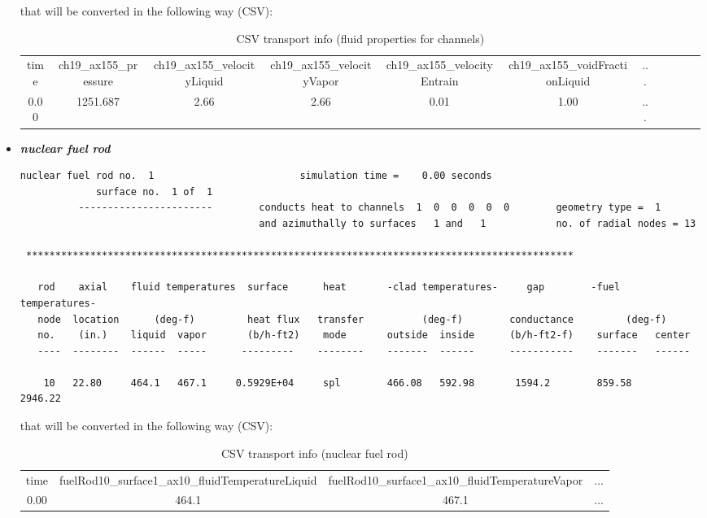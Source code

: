 \begin{itemize}
\begin{lstlisting}[basicstyle=\tiny]
  \end{lstlisting}
   that will be converted in the following way (CSV):
   \begin{table}[h]
    \centering
    \caption{CSV transport info (fluid properties for channels)}
    \label{CSVfluidProperties}
    \tabcolsep=0.11cm
    \tiny
    \begin{tabular}{|c|c|c|c|c|c|c|c|c|c|c|}
     time & ch19\_ax155\_pressure  & ch19\_ax155\_velocityLiquid & ch19\_ax155\_velocityVapor & ch19\_ax155\_velocityEntrain & ch19\_ax155\_voidFractionLiquid & ...\\
     0.00 & 1251.687 & 2.66           & 2.66   & 0.01        & 1.00 & ...
    \end{tabular}
   \end{table}

  \item \textit{\textbf{nuclear fuel rod}}
  \begin{lstlisting}[basicstyle=\tiny]
          nuclear fuel rod no.  1                         simulation time =    0.00 seconds
             surface no.  1 of  1
          -----------------------        conducts heat to channels  1  0  0  0  0  0        geometry type =  1
                                         and azimuthally to surfaces   1 and   1            no. of radial nodes = 13

 **********************************************************************************************

   rod    axial    fluid temperatures  surface      heat       -clad temperatures-     gap        -fuel temperatures-
   node  location      (deg-f)         heat flux   transfer          (deg-f)        conductance         (deg-f)
   no.    (in.)    liquid  vapor       (b/h-ft2)    mode       outside  inside      (b/h-ft2-f)    surface   center
   ----  --------  ------  -----      ---------    --------    -------  ------      -----------    -------   ------

    10   22.80     464.1   467.1     0.5929E+04     spl        466.08   592.98       1594.2        859.58     2946.22
\end{lstlisting}
   that will be converted in the following way (CSV):
   \begin{table}[h]
     \centering
     \caption{CSV transport info (nuclear fuel rod)}
     \label{CSVfuelRod}
     \tabcolsep=0.11cm
     \tiny
     \begin{tabular}{|c|c|c|c|}
     time    & fuelRod10\_surface1\_ax10\_fluidTemperatureLiquid  & fuelRod10\_surface1\_ax10\_fluidTemperatureVapor & ... \\
     0.00 & 464.1 & 467.1  &  ...
     \end{tabular}
   \end{table}


\end{itemize}

